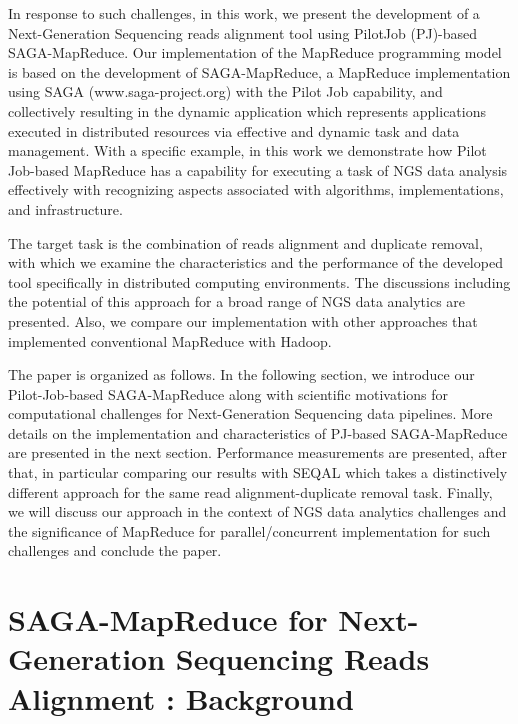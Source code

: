 \documentclass{sig-alternate}
\begin{document}
In response to such challenges, in this work, we present the development of a Next-Generation Sequencing reads alignment tool using PilotJob (PJ)-based SAGA-MapReduce.  Our implementation of the MapReduce programming model is based on the development of SAGA-MapReduce, a MapReduce implementation using SAGA (www.saga-project.org) with the Pilot Job capability, and collectively resulting in the dynamic application which represents applications executed in distributed resources via effective and dynamic task and data management.  With a specific example, in this work we demonstrate how Pilot Job-based MapReduce has a capability for executing a task of NGS data analysis effectively with recognizing aspects associated with algorithms, implementations, and infrastructure.

The target task is the combination of reads alignment and duplicate removal, with which we examine the characteristics and the performance of the developed tool specifically in distributed computing environments.  The discussions including the potential of this approach for a broad range of NGS data analytics are presented.  Also, we compare our implementation with other approaches that implemented conventional MapReduce with Hadoop.

The paper is organized as follows. In the following section, we introduce our Pilot-Job-based SAGA-MapReduce along with scientific motivations for computational challenges for Next-Generation Sequencing data pipelines.  More details on the implementation and characteristics of PJ-based SAGA-MapReduce are presented in the next section.  Performance measurements are presented, after that, in particular comparing our results with SEQAL which takes a distinctively different approach for the same read alignment-duplicate removal task.  Finally, we will discuss our approach in the context of NGS data analytics challenges and the significance of MapReduce for parallel/concurrent implementation for such challenges and conclude the paper.


\section{SAGA-MapReduce for Next-Generation Sequencing Reads Alignment : Background}


\end{document}
